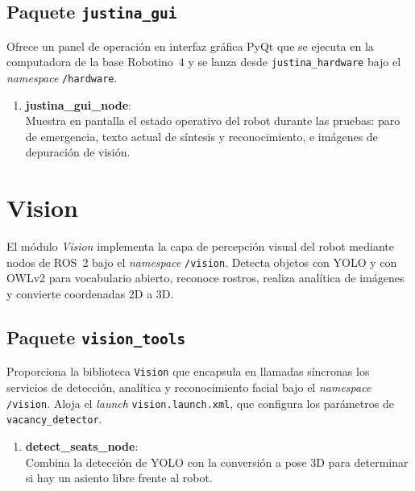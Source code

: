 \subsection{Paquete \texttt{justina\_gui}}
Ofrece un panel de operación en interfaz gráfica PyQt que se ejecuta en la computadora de la base Robotino~4 y se lanza desde \texttt{justina\_hardware} bajo el \textit{namespace} \texttt{/hardware}.

\begin{enumerate}
    \item \textbf{justina\_gui\_node}: \\
    Muestra en pantalla el estado operativo del robot durante las pruebas: paro de emergencia, texto actual de síntesis y reconocimiento, e imágenes de depuración de visión.
\end{enumerate}


\section[Vision]{Vision}
\label{app:justina_vision}

El módulo \textit{Vision} implementa la capa de percepción visual del robot mediante nodos de ROS~2 bajo el \textit{namespace} \texttt{/vision}. Detecta objetos con YOLO y con OWLv2 para vocabulario abierto, reconoce rostros, realiza analítica de imágenes y convierte coordenadas 2D a 3D.

\subsection{Paquete \texttt{vision\_tools}}
Proporciona la biblioteca \texttt{Vision} que encapsula en llamadas síncronas los servicios de detección, analítica y reconocimiento facial bajo el \textit{namespace} \texttt{/vision}. Aloja el \textit{launch} \texttt{vision.launch.xml}, que configura los parámetros de \texttt{vacancy\_detector}.

\begin{enumerate}
    \item \textbf{detect\_seats\_node}: \\
    Combina la detección de YOLO con la conversión a pose 3D para determinar si hay un asiento libre frente al robot.
\end{enumerate}

